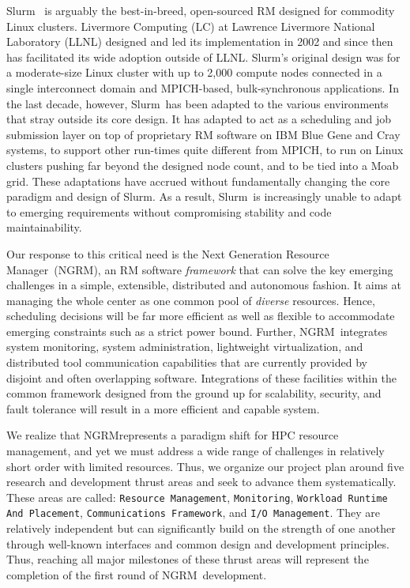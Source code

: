 \documentclass{article}
\newcommand{\ngrm}{NGRM}
\newcommand{\ngrmfull}{Next Generation Resource Manager}
\newcommand{\slurm}{Slurm}
\newcommand{\moab}{Moab}
\begin{document}
\slurm~\cite{SlurmDesign} is arguably the
best-in-breed, open-sourced RM designed for commodity Linux clusters.
Livermore Computing (LC) at Lawrence Livermore National Laboratory (LLNL)
designed and led its implementation in 2002 and since then has facilitated
its wide adoption outside of LLNL.
\slurm's original design was for a moderate-size Linux cluster with up to 2,000 
compute nodes connected in a single interconnect domain and MPICH-based, 
bulk-synchronous applications.
In the last decade, however, \slurm\ has been adapted to the various
environments that stray outside its core design.
It has adapted to act as a scheduling and job submission layer
on top of proprietary RM software on IBM Blue Gene and Cray systems,
to support other run-times quite different from MPICH,
to run on Linux clusters pushing far beyond the designed node count,
and to be tied into a \moab~\cite{MOAB:online} grid.
These adaptations have accrued without fundamentally changing the
core paradigm and design of \slurm. As a result, \slurm\ is increasingly
unable to adapt to emerging requirements without compromising
stability and code maintainability.

Our response to this critical need is the \ngrmfull\ (\ngrm ), an RM software
{\em framework} that can solve the key emerging challenges 
in a simple, extensible, distributed and autonomous fashion.
It aims at managing the whole center as one common pool of {\em diverse} 
resources. Hence, scheduling decisions will be 
far more efficient as well as flexible to accommodate 
emerging constraints such as a strict power bound. 
Further, \ngrm\ integrates
system monitoring, system administration, lightweight
virtualization, and distributed tool communication capabilities
that are currently provided by disjoint and often overlapping software.
Integrations of these facilities within the common framework designed from
the ground up for scalability, security, and fault tolerance will result
in a more efficient and capable system.

We realize that \ngrm represents a paradigm shift for HPC resource management, 
and yet we must address a wide range of challenges in relatively short order
with limited resources. Thus, we 
organize our project plan around five research and development thrust areas 
and seek to advance them systematically.
These areas are called:
{\tt Resource Management},
{\tt Monitoring},
{\tt Workload Runtime And Placement}, 
{\tt Communications Framework}, and
{\tt I/O Management}.
They are relatively independent but can significantly build on the
strength of one another through well-known interfaces and common design
and development principles.
Thus, reaching all major milestones of these thrust areas 
will represent the completion of the first round of \ngrm\ development. 
\end{document}

